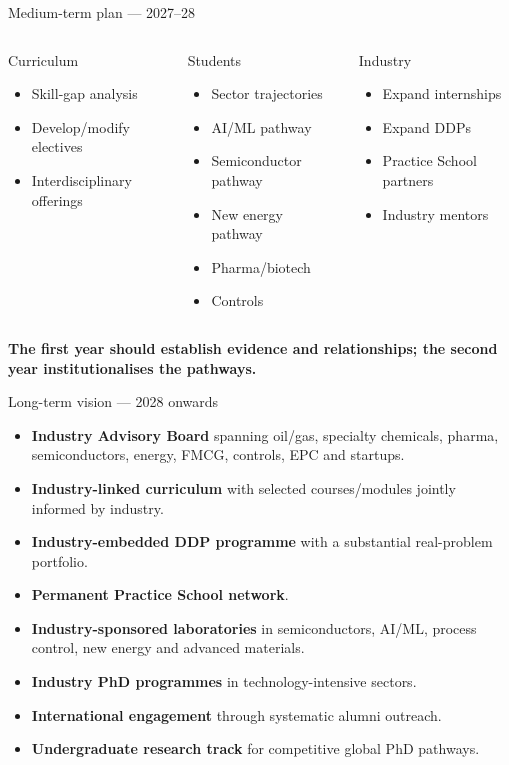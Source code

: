 \documentclass[aspectratio=169,11pt]{beamer}
\newcommand{\key}[1]{\textbf{\color{IITblue}#1}}
\begin{document}
\begin{frame}{Medium-term plan — 2027--28}
\begin{columns}[T]
\begin{block}{Curriculum}
\begin{itemize}
\item Skill-gap analysis
\item Develop/modify electives
\item Interdisciplinary offerings
\end{itemize}
\end{block}
\begin{block}{Students}
\begin{itemize}
\item Sector trajectories
\item AI/ML pathway
\item Semiconductor pathway
\item New energy pathway
\item Pharma/biotech
\item Controls
\end{itemize}
\end{block}
\begin{block}{Industry}
\begin{itemize}
\item Expand internships
\item Expand DDPs
\item Practice School partners
\item Industry mentors
\end{itemize}
\end{block}
\end{columns}
\vspace{5mm}
\centering\key{The first year should establish evidence and relationships; the second year institutionalises the pathways.}
\end{frame}

\begin{frame}{Long-term vision — 2028 onwards}
\begin{itemize}
\item \key{Industry Advisory Board} spanning oil/gas, specialty chemicals, pharma, semiconductors, energy, FMCG, controls, EPC and startups.
\item \key{Industry-linked curriculum} with selected courses/modules jointly informed by industry.
\item \key{Industry-embedded DDP programme} with a substantial real-problem portfolio.
\item \key{Permanent Practice School network}.
\item \key{Industry-sponsored laboratories} in semiconductors, AI/ML, process control, new energy and advanced materials.
\item \key{Industry PhD programmes} in technology-intensive sectors.
\item \key{International engagement} through systematic alumni outreach.
\item \key{Undergraduate research track} for competitive global PhD pathways.
\end{itemize}
\end{frame}
\end{document}
